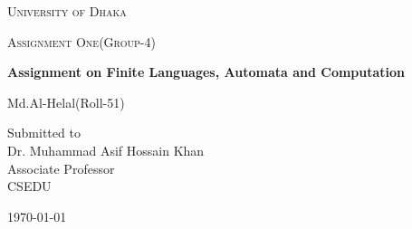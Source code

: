 \documentclass[12pt,a4paper]{report}
\begin{document}
\begin{titlepage}
\centering
{\scshape\LARGE University of Dhaka \par}
\vspace{1cm}
{\scshape\Large Assignment One(Group-4)\par}
\vspace{1.5cm}
{\huge\bfseries Assignment on Finite Languages, Automata and Computation\par}
\vspace{2cm}
{\Large Md.Al-Helal(Roll-51)\par}
\vfill
Submitted to \\
\vspace{0.5cm}
{Dr. Muhammad Asif Hossain Khan}\\ Associate Professor\\CSEDU
\vfill
{\large \today\par}
\end{titlepage}
\end{document}
